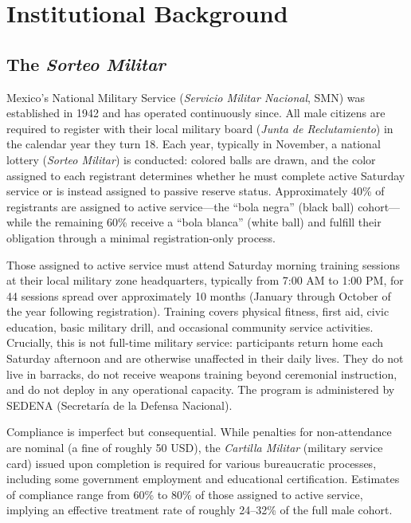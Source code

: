 \documentclass[12pt]{article}
\begin{document}
\section{Institutional Background}
\label{sec:background}

\subsection{The \textit{Sorteo Militar}}

Mexico's National Military Service (\textit{Servicio Militar Nacional}, SMN) was established in 1942 and has operated continuously since. All male citizens are required to register with their local military board (\textit{Junta de Reclutamiento}) in the calendar year they turn 18. Each year, typically in November, a national lottery (\textit{Sorteo Militar}) is conducted: colored balls are drawn, and the color assigned to each registrant determines whether he must complete active Saturday service or is instead assigned to passive reserve status. Approximately 40\% of registrants are assigned to active service---the ``bola negra'' (black ball) cohort---while the remaining 60\% receive a ``bola blanca'' (white ball) and fulfill their obligation through a minimal registration-only process.

Those assigned to active service must attend Saturday morning training sessions at their local military zone headquarters, typically from 7:00 AM to 1:00 PM, for 44 sessions spread over approximately 10 months (January through October of the year following registration). Training covers physical fitness, first aid, civic education, basic military drill, and occasional community service activities. Crucially, this is not full-time military service: participants return home each Saturday afternoon and are otherwise unaffected in their daily lives. They do not live in barracks, do not receive weapons training beyond ceremonial instruction, and do not deploy in any operational capacity. The program is administered by SEDENA (Secretar{\'i}a de la Defensa Nacional).

Compliance is imperfect but consequential. While penalties for non-attendance are nominal (a fine of roughly 50 USD), the \textit{Cartilla Militar} (military service card) issued upon completion is required for various bureaucratic processes, including some government employment and educational certification. Estimates of compliance range from 60\% to 80\% of those assigned to active service, implying an effective treatment rate of roughly 24--32\% of the full male cohort.
\end{document}
